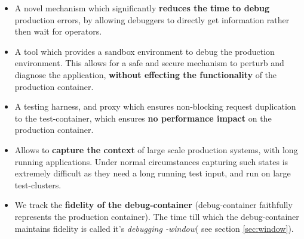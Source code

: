 \begin{itemize}[leftmargin=*,topsep=0pt,itemsep=-1ex,partopsep=1ex,parsep=1ex]
\item A novel mechanism which significantly \textbf{reduces the time to debug} production errors, by allowing debuggers to directly get information rather then wait for operators.
\item A tool which provides a sandbox environment to debug the production environment. 
This allows for a safe and secure mechanism to perturb and diagnose the application, \textbf{without effecting the functionality} of the  production container.
\item A testing harness, and proxy which ensures non-blocking request duplication to the test-container, which ensures \textbf{no performance impact} on the production container. 
\item Allows to \textbf{capture the context} of large scale production systems, with long running applications. Under normal circumstances capturing such states is extremely difficult as they need a long running test input, and run on large test-clusters.
\item We track the \textbf{fidelity of the debug-container} (debug-container faithfully represents the production container). 
The time till which the debug-container maintains fidelity is called it's \emph{debugging -window}( see section \ref{sec:window}).


\end{itemize}

